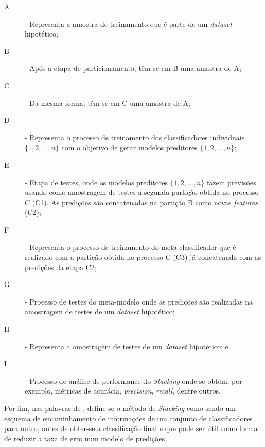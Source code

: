 \begin{description}
    \item[A] - Representa a amostra de treinamento que é parte de um \textit{dataset} hipotético;
    
    \item[B] - Após a etapa de particionamento, têm-se em B uma amostra de A;
    
    \item[C] - Da mesma forma, têm-se em C uma amostra de A;
    
    \item[D] - Representa o processo de treinamento dos classificadores individuais $\{1, 2, ..., n\}$ com o objetivo de gerar modelos preditores $\{1, 2, ..., n\}$;
    
    \item[E] - Etapa de testes, onde os modelos preditores $\{1, 2, ..., n\}$ fazem previsões usando como amostragem de testes a segunda partição obtida no processo C (C1). As predições são concatenadas na partição B como novas \textit{features} (C2);
    
    \item[F] - Representa o processo de treinamento do meta-classificador que é realizado com a partição obtida no processo C (C3) já concatenada com as predições da etapa C2;
    
    \item[G] - Processo de testes do meta-modelo onde as predições são realizadas na amostragem de testes de um \textit{dataset} hipotético;
    
    \item[H] - Representa a amostragem de testes de um \textit{dataset} hipotético; e
    
    \item[I] - Processo de análise de performance do \textit{Stacking} onde se obtém, por exemplo, métricas de acurácia, \textit{precision}, \textit{recall}, dentre outros.
\end{description}

Por fim, nas palavras de , define-se o método de \textit{Stacking} como sendo um esquema de encaminhamento de informações de um conjunto de classificadores para outro, antes de obter-se a classificação final e que pode ser útil como forma de reduzir a taxa de erro num modelo de predições.

